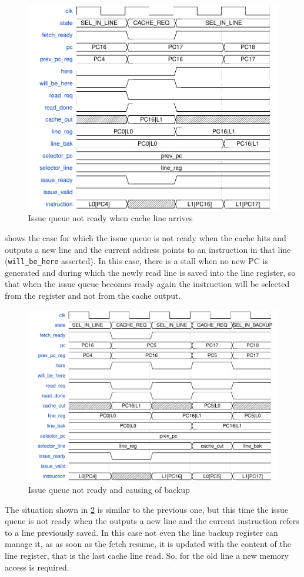 \begin{figure}[!h]
  \centering
  \includegraphics[scale=.6]{img/fetch05.pdf}
  \caption{Issue queue not ready when cache line arrives}
  \label{fig:fetch05}
\end{figure}
 shows the case for which the issue queue is not ready when the cache hits and outputs a new line and the current address points to an instruction in that line (\texttt{will\_be\_here} asserted). In this case, there is a stall when no new \ac{PC} is generated and during which the newly read line is saved into the line register, so that when the issue queue becomes ready again the instruction will be selected from the register and not from the cache output.

\begin{figure}[!h]
  \centering
  \includegraphics[scale=.6]{img/fetch08.pdf}
  \caption{Issue queue not ready and causing of backup}
  \label{fig:fetch08}
\end{figure}
The situation shown in \cref{fig:fetch08} is similar to the previous one, but this time the issue queue is not ready when the outputs a new line and the current instruction refers to a line previously saved. In this case not even the line backup register can manage it, as as soon as the fetch resume, it is updated with the content of the line register, that is the last cache line read. So, for the old line a new memory access is required.

